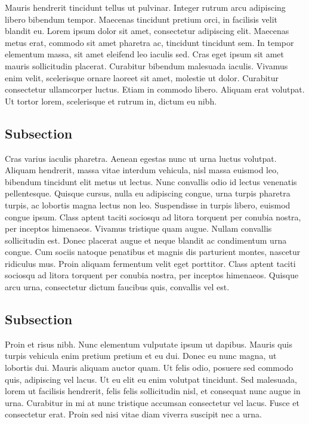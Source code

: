 Mauris hendrerit tincidunt tellus ut pulvinar. Integer rutrum arcu \cite{madden2002tta} adipiscing libero bibendum tempor. Maecenas tincidunt pretium orci, in facilisis velit blandit eu. Lorem ipsum dolor sit amet, consectetur adipiscing elit. Maecenas metus erat, commodo sit amet pharetra ac, tincidunt tincidunt sem. In tempor elementum massa, sit amet eleifend leo iaculis sed. Cras eget ipsum sit amet mauris sollicitudin placerat. Curabitur bibendum malesuada iaculis. Vivamus enim velit, scelerisque ornare laoreet sit amet, molestie ut dolor. Curabitur consectetur ullamcorper luctus. Etiam in commodo libero. Aliquam erat volutpat. Ut tortor lorem, scelerisque et rutrum in, dictum eu nibh. 

\subsection{Subsection}
Cras varius iaculis pharetra. Aenean egestas nunc ut urna luctus volutpat. Aliquam hendrerit, massa vitae interdum vehicula, nisl massa euismod leo, bibendum tincidunt elit metus ut lectus. Nunc convallis odio id lectus venenatis pellentesque. Quisque cursus, nulla eu adipiscing congue, urna turpis pharetra turpis, ac lobortis magna lectus non leo. Suspendisse in turpis libero, euismod congue ipsum. Class aptent taciti sociosqu ad litora torquent per conubia nostra, per inceptos himenaeos. Vivamus tristique quam augue. Nullam convallis sollicitudin est. Donec placerat augue et neque blandit ac condimentum urna congue. Cum sociis natoque penatibus et magnis dis parturient montes, nascetur ridiculus mus. Proin aliquam fermentum velit eget porttitor. Class aptent taciti sociosqu ad litora torquent per conubia nostra, per inceptos himenaeos. Quisque arcu urna, consectetur dictum faucibus quis, convallis vel est. 

\subsection{Subsection}
Proin et risus nibh. Nunc elementum vulputate ipsum ut dapibus. Mauris quis turpis vehicula enim pretium pretium et eu dui. Donec eu nunc magna, ut lobortis dui. Mauris aliquam auctor quam. Ut felis odio, posuere sed commodo quis, adipiscing vel lacus.\cite{Chang2000qy} Ut eu elit eu enim volutpat tincidunt. Sed malesuada, lorem ut facilisis hendrerit, felis felis sollicitudin nisl, et consequat nunc augue in urna. Curabitur in mi at nunc tristique accumsan consectetur vel lacus. Fusce et consectetur erat. Proin sed nisi vitae diam viverra suscipit nec a urna. 

